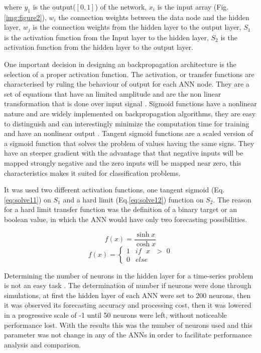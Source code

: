 where $y_1$ is the output($[0, 1]$) of the network, $x_i$ is the input array (Fig. \ref{img:figure2}), $w_i$ the connection weights between the data node and the hidden layer, $w_j$ is the connection weights from the hidden layer to the output layer, $S_1$ is the activation function from the Input layer to the hidden layer, $S_2$ is the activation function from the hidden layer to the output layer.

One important decision in designing an backpropagation architecture is the selection of a proper activation function. The activation, or transfer functions are characterised by ruling the behaviour of output for each ANN node. They are a set of equations that have an limited amplitude and are the non linear transformation that is done over input signal \cite{karlik2011performance}. Sigmoid functions have a nonlinear nature and are widely implemented on backpropagation algorithms, they are easy to distinguish and can interestingly minimize the computation time for training and have an nonlinear output \cite{hecht1992theory, karlik2011performance}. Tangent sigmoid functions are a scaled version of a sigmoid function that solves the problem of values having the same signs. They have an steeper gradient with the advantage that that negative inputs will be mapped strongly negative and the zero inputs will be mapped near zero, this characteristics makes it suited for classification problems.

It was used two different activation functions, one tangent sigmoid (Eq.\ref{eq:solve11}) on $S_1$ and a hard limit (Eq.\ref{eq:solve12}) function on $S_2$. The reason for a hard limit transfer function was the definition of a binary target or an boolean value, in which the ANN would have only two forecasting possibilities.

\begin{equation}
\label{eq:solve11}
f(x) = \frac{\sinh{x}}{\cosh{x}}
\end{equation}
\begin{equation}
\label{eq:solve12}
f(x)=\begin{cases} 
      1 & \text{$if$ $x$ $>$ 0}\\
      0 & \text{$else$}
     \end{cases} 
\end{equation}

Determining the number of neurons in the hidden layer for a time-series problem is not an easy task \cite{zhang1998forecasting}. The determination of number if neurons were done through simulations, at first the hidden layer of each ANN were set to 200 neurons, then it was observed its forecasting accuracy and processing cost, then it was lowered in a progressive scale of -1 until 50 neurons were left, without noticeable performance lost. With the results this was the number of neurons used and this parameter was not change in any of the ANNs in order to facilitate performance analysis and comparison.

